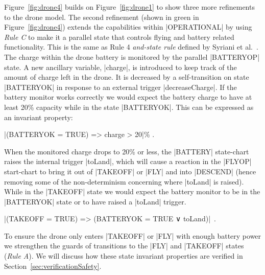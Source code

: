 Figure~\ref{fig:drone4} builds on Figure~\ref{fig:drone1} to show three more refinements to the drone model. 
The second refinement (shown in green in Figure~\ref{fig:drone4}) extends the capabilities within |OPERATIONAL| by using \emph{Rule C} to make it a parallel state that controls flying and battery related functionality. 
This is the same as Rule 4 \emph{and-state rule} defined by Syriani et al.~\cite{Syriani_2019}.
The charge within the drone battery is monitored by the parallel |BATTERYOP| state. 
A new ancillary variable, |charge|, is introduced to keep track of the amount of charge left in the drone.
It is decreased by a self-transition on state |BATTERYOK| in response to an external trigger |decreaseCharge|. 
If the battery monitor works correctly we would expect the battery charge to have at least 20\% capacity while in the state |BATTERYOK|.
This can be expressed as an invariant property:
\begin{center}
	|(BATTERYOK = TRUE) => charge > 20|\% .
\end{center}
When the monitored charge drops to 20\% or less, the |BATTERY| state-chart raises the internal trigger |toLand|, which will cause a reaction in the |FLYOP| start-chart to bring it out of |TAKEOFF| or |FLY| and into |DESCEND| (hence removing some of the non-determinism concerning where |toLand| is raised).
While in the |TAKEOFF| state we would expect the battery monitor to be in the |BATTERYOK| state or to have raised a |toLand| trigger.
\begin{center}
	|(TAKEOFF = TRUE) => (BATTERYOK = TRUE ∨ toLand)|~.
\end{center}
To ensure the drone only enters |TAKEOFF| or |FLY| with enough battery power we strengthen the guards of transitions to the |FLY| and |TAKEOFF| states (\emph{Rule A}).
We will discuss how these state invariant properties are verified in Section~\ref{sec:verificationSafety}.


